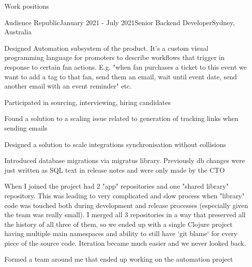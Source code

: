 \documentclass{resume} %
\begin{document}
\begin{rSection}{Work positions}
\begin{rSubsection}{Audience Republic}{January 2021 - July 2021}{Senior Backend Developer}{Sydney, Australia} %
\item Designed Automation subsystem of the product. It's a custom visual
    programming language for promoters to describe
    workflows that trigger in response to certain fan actions. E.g. "when fan 
    purchases a ticket to this event we want to add a tag to that fan,
    send them an email, wait until event date, send another email with an
    event reminder" etc.
\item Participated in sourcing, interviewing, hiring candidates
\item Found a solution to a scaling issue related to generation of tracking
      links when sending emails 
\item Designed a solution to scale integrations synchronisation without
      collisions %
\item Introduced database migrations via migratus library. Previously
    db changes were just written as SQL text in release notes and were only made by the CTO
\item When I joined the project had 2 "app" repositories and one "shared
    library" repository. This was leading to very complicated and slow
    process when "library" code was touched both during development and
    release processes (especially given the team was really small). I merged
    all 3 repositories in a way that preserved all the history of all three
    of them, so we ended up with a single Clojure project having multiple
    main namespaces and ability to still have `git blame` for every piece of
    the source code. Iteration became much easier and we never looked back.
\item Formed a team around me that ended up working on the automation project
~
\end{rSubsection}


\end{rSection}
\end{document}
